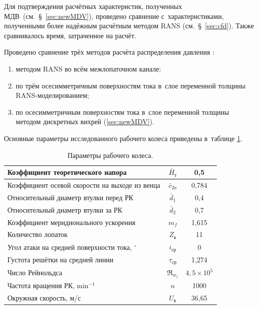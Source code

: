 \begin{enumerate}
Для подтверждения расчётных характеристик, полученных МДВ~(см.~\S~\ref{sec:newMDV}), проведено сравнение с~характеристиками, полученными более надёжным расчётным методом RANS (см.~\S~\ref{sec:cfd}).
Также сравнивалось время, затраченное на расчёт.

Проведено сравнение трёх методов расчёта распределения давления \autocite{furashov2025}:
\begin{enumerate}
	\item методом RANS во всём межлопаточном канале;
	\item по трём осесимметричным поверхностям тока в~слое переменной толщины RANS-моделированием;
	\item по осесимметричным поверхностям тока в~слое переменной толщины методом дискретных вихрей (\ref{sec:newMDV}).
\end{enumerate}

Основные параметры исследованного рабочего колеса приведены в~таблице \ref{paramRotor}.
\begin{table}[htb]
	\caption{Параметры рабочего колеса.}
	\label{paramRotor}
	\centering
	\begin{tabular}{l|c|c}
		Коэффициент теоретического напора & \(\bar{H}_\text{т}\) & 0,5\\\hline
		Коэффициент осевой скорости на выходе из венца & \(\bar{c}_{2a}\) & 0,784\\\hline
		Относительный диаметр втулки перед РК~&  \(\bar{d}_{1}\) & 0,4\\\hline
		Относительный диаметр втулки за РК & \(\bar{d}_{2}\) & 0,7\\\hline
		Коэффициент меридионального ускорения & \(m_{f}\) & 1,615\\\hline
		Количество лопаток & \(Z_{к}\) & 11\\\hline
		Угол атаки на средней поверхности тока, \(^{\circ}\) & \(i_\text{ср}\) & 0\\\hline
		Густота решётки на средней линии & \(\tau_\text{ср}\) & 1,274\\\hline
		Число Рейнольдса & \(\Re_{w_1}\) & \(4,5 \times 10^5\)\\\hline
		Частота вращения РК, \(\si\minute^{-1}\) & \(n\) & 1000\\\hline
		Окружная скорость, м/с & \(U_\text{к}\) & 36,65\\
	\end{tabular}
\end{table}


\end{enumerate}
